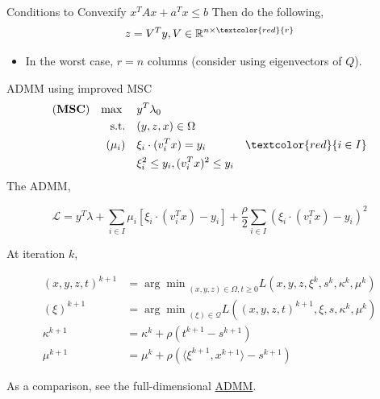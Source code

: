 \documentclass[aspectratio=1610, 9pt]{beamer}
\newcommand{\model}[1]{(\textbf{#1})}
\newcommand{\mx}{\mathbf{\max}\;}
\newcommand{\red}[1]{\textcolor{red}{#1}}
\newcommand{\real}{\mathbb{R}}
\begin{document}
\begin{frame}[allowframebreaks]{Conditions to Convexify \(x^TAx + a^Tx \le b\)}
  Then do the following,
  \begin{align*}
    z = V^T y , V\in \real^{n \times \red{r}}
  \end{align*}

  \begin{itemize}
    \item In the worst case, \(r=n\) columns (consider using eigenvectors of \(Q\)).
  \end{itemize}


\end{frame}

\begin{frame}{ADMM using improved MSC}
  \begin{align}
    \model{MSC} \quad \mx \quad & y ^T\lambda_0                                       \\
    \mathrm{s.t.} \quad         & (y,z,x) \in \Omega                                  \\
    ( \mu_i)    \quad           & \xi_i \cdot (v_i^Tx) = y_i           & \red{i\in I} \\
                                & \xi_i^2 \le y_i,  (v_i^Tx)^2 \le y_i
  \end{align}
  The ADMM,

  \begin{equation}
    \mathcal L = y^T\lambda + \sum_{i \in I} \mu_i \left [\xi_i \cdot(v_i^Tx) - y_i\right] + \frac{\rho}{2}\sum_{i \in I} (\xi_i \cdot (v_i^Tx) - y_i)^2
  \end{equation}

  At iteration \(k\),

  \begin{align*}
    (x,y,z,t)^{k+1} & = {\arg\min}_{(x,y,z)\in\Omega, t\ge 0} L\left(x,y,z,\xi^k,s^k,\kappa^k,\mu^k\right)    \\
    (\xi)^{k+1}     & = {\arg\min}_{(\xi)\in\mathscr{Q}} L\left((x,y,z,t)^{k+1},\xi,s, \kappa^k, \mu^k\right) \\
    \kappa^{k+1}    & = \kappa^k + \rho\left(t^{k+1}-s^{k+1}\right)                                           \\
    \mu^{k+1}       & = \mu^k + \rho\left( \langle\xi^{k+1}, x^{k+1}\rangle - s^{k+1}\right)
  \end{align*}

  As a comparison, see the full-dimensional \hyperlink{oldad}{ADMM}.
\end{frame}
\end{document}
